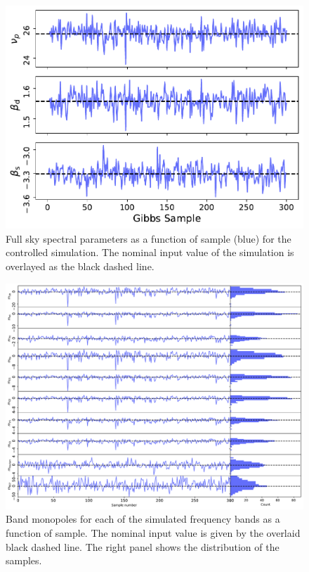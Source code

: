\documentclass{aa}
\begin{document}
\begin{figure}
\includegraphics[width=\linewidth]{figs/spec_para_trace.pdf}
\caption{Full sky spectral parameters as a function of sample (blue) for the controlled simulation. The nominal input value of the simulation is overlayed as the black dashed line.}
\label{fig:simulated_indices}
\end{figure}

\begin{figure}
\includegraphics[width=\linewidth]{figs/all_monopole.pdf}
\caption{Band monopoles for each of the simulated frequency bands as a function of sample. The nominal input value is given by the overlaid black dashed line. The right panel shows the distribution of the samples.}
\label{fig:simulated_monopoles}
\end{figure}
\end{document}
